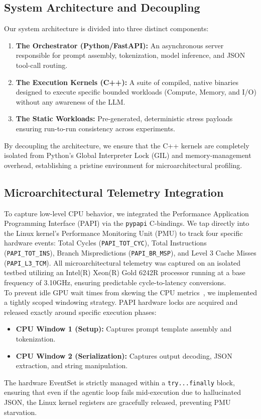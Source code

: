 \documentclass[10pt, letterpaper]{article}
\begin{document}
\subsection{System Architecture and Decoupling}
Our system architecture is divided into three distinct components:
\begin{enumerate}
\item \textbf{The Orchestrator (Python/FastAPI):} An asynchronous server responsible for prompt assembly, tokenization, model inference, and JSON tool-call routing.
\item \textbf{The Execution Kernels (C++):} A suite of compiled, native binaries designed to execute specific bounded workloads (Compute, Memory, and I/O) without any awareness of the LLM.
\item \textbf{The Static Workloads:} Pre-generated, deterministic stress payloads ensuring run-to-run consistency across experiments.
\end{enumerate}
By decoupling the architecture, we ensure that the C++ kernels are completely isolated from Python's Global Interpreter Lock (GIL) and memory-management overhead, establishing a pristine environment for microarchitectural profiling.

\subsection{Microarchitectural Telemetry Integration}
To capture low-level CPU behavior, we integrated the Performance Application Programming Interface (PAPI) via the \texttt{pypapi} C-bindings. We tap directly into the Linux kernel's Performance Monitoring Unit (PMU) to track four specific hardware events: Total Cycles (\texttt{PAPI\_TOT\_CYC}), Total Instructions (\texttt{PAPI\_TOT\_INS}), Branch Mispredictions (\texttt{PAPI\_BR\_MSP}), and Level 3 Cache Misses (\texttt{PAPI\_L3\_TCM}). All microarchitectural telemetry was captured on an isolated testbed utilizing an  Intel(R) Xeon(R) Gold 6242R processor running at a base frequency of 3.10GHz, ensuring predictable cycle-to-latency conversions.\\

\noindent To prevent idle GPU wait times from skewing the CPU metrics~\cite{coupled_architectures}, we implemented a tightly scoped windowing strategy. PAPI hardware locks are acquired and released exactly around specific execution phases:
\begin{itemize}
\item \textbf{CPU Window 1 (Setup):} Captures prompt template assembly and tokenization.
\item \textbf{CPU Window 2 (Serialization):} Captures output decoding, JSON extraction, and string manipulation.
\end{itemize}
The hardware EventSet is strictly managed within a \texttt{try...finally} block, ensuring that even if the agentic loop fails mid-execution due to hallucinated JSON, the Linux kernel registers are gracefully released, preventing PMU starvation.
\end{document}
